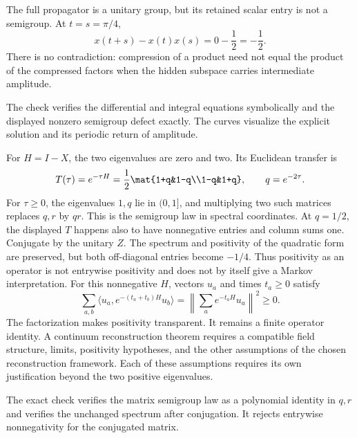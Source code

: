 The full propagator is a unitary group, but its retained scalar entry is not a semigroup. At $t=s=\pi/4$,
\[
x(t+s)-x(t)x(s)=0-\frac12=-\frac12.
\]
There is no contradiction: compression of a product need not equal the product of the compressed factors when the hidden subspace carries intermediate amplitude.

The check verifies the differential and integral equations symbolically and the displayed nonzero semigroup defect exactly. The curves visualize the explicit solution and its periodic return of amplitude.

For $H=I-X$, the two eigenvalues are zero and two. Its Euclidean transfer is
\[
T(\tau)=e^{-\tau H}
=\frac12\mat{1+q&1-q\\1-q&1+q},\qquad q=e^{-2\tau}.
\]
For $\tau\ge0$, the eigenvalues $1,q$ lie in $(0,1]$, and multiplying two such matrices replaces $q,r$ by $qr$. This is the semigroup law in spectral coordinates.
At $q=1/2$, the displayed $T$ happens also to have nonnegative entries and column sums one. Conjugate by the unitary $Z$. The spectrum and positivity of the quadratic form are preserved, but both off-diagonal entries become $-1/4$. Thus positivity as an operator is not entrywise positivity and does not by itself give a Markov interpretation.
For this nonnegative $H$, vectors $u_a$ and times $t_a\ge0$ satisfy
\[
\sum_{a,b}\langle u_a,e^{-(t_a+t_b)H}u_b\rangle
=\left\|\sum_a e^{-t_aH}u_a\right\|^2\ge0.
\]
The factorization makes positivity transparent. It remains a finite operator identity. A continuum reconstruction theorem requires a compatible field structure, limits, positivity hypotheses, and the other assumptions of the chosen reconstruction framework. Each of these assumptions requires its own justification beyond the two positive eigenvalues.

The exact check verifies the matrix semigroup law as a polynomial identity in $q,r$ and verifies the unchanged spectrum after conjugation. It rejects entrywise nonnegativity for the conjugated matrix.

